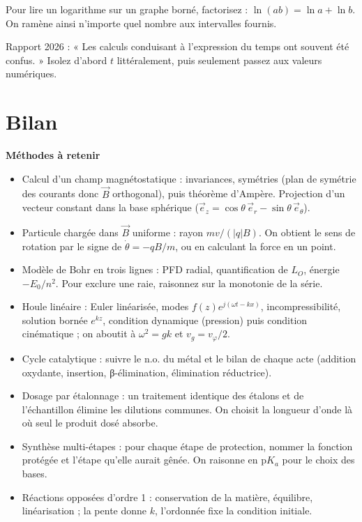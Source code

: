 \documentclass[11pt,a4paper]{article}
\providecommand{\tightlist}{\setlength{\itemsep}{0pt}\setlength{\parskip}{0pt}}
\begin{document}
\begin{methode}

Pour lire un logarithme sur un graphe borné, factorisez : \(\ln(ab)=\ln a+\ln b\). On ramène ainsi n'importe quel nombre aux intervalles fournis.

\end{methode}

\begin{jury}

Rapport 2026 : « Les calculs conduisant à l'expression du temps ont souvent été confus. » Isolez d'abord \(t\) littéralement, puis seulement passez aux valeurs numériques.

\end{jury}

\hypertarget{bilan}{%
\section{Bilan}\label{bilan}}

\textbf{Méthodes à retenir}

\begin{itemize}
\tightlist
\item
  Calcul d'un champ magnétostatique : invariances, symétries (plan de symétrie des courants donc \(\vec B\) orthogonal), puis théorème d'Ampère. Projection d'un vecteur constant dans la base sphérique (\(\vec e_z=\cos\theta\,\vec e_r-\sin\theta\,\vec e_\theta\)).
\item
  Particule chargée dans \(\vec B\) uniforme : rayon \(mv/(\lvert q\rvert B)\). On obtient le sens de rotation par le signe de \(\dot\theta=-qB/m\), ou en calculant la force en un point.
\item
  Modèle de Bohr en trois lignes : PFD radial, quantification de \(L_O\), énergie \(-E_0/n^2\). Pour exclure une raie, raisonnez sur la monotonie de la série.
\item
  Houle linéaire : Euler linéarisée, modes \(f(z)e^{j(\omega t-kx)}\), incompressibilité, solution bornée \(e^{kz}\), condition dynamique (pression) puis condition cinématique ; on aboutit à \(\omega^2=gk\) et \(v_g=v_\varphi/2\).
\item
  Cycle catalytique : suivre le n.o. du métal et le bilan de chaque acte (addition oxydante, insertion, β-élimination, élimination réductrice).
\item
  Dosage par étalonnage : un traitement identique des étalons et de l'échantillon élimine les dilutions communes. On choisit la longueur d'onde là où seul le produit dosé absorbe.
\item
  Synthèse multi-étapes : pour chaque étape de protection, nommer la fonction protégée et l'étape qu'elle aurait gênée. On raisonne en \(\mathrm{p}K_a\) pour le choix des bases.
\item
  Réactions opposées d'ordre 1 : conservation de la matière, équilibre, linéarisation ; la pente donne \(k\), l'ordonnée fixe la condition initiale.
\end{itemize}
\end{document}
